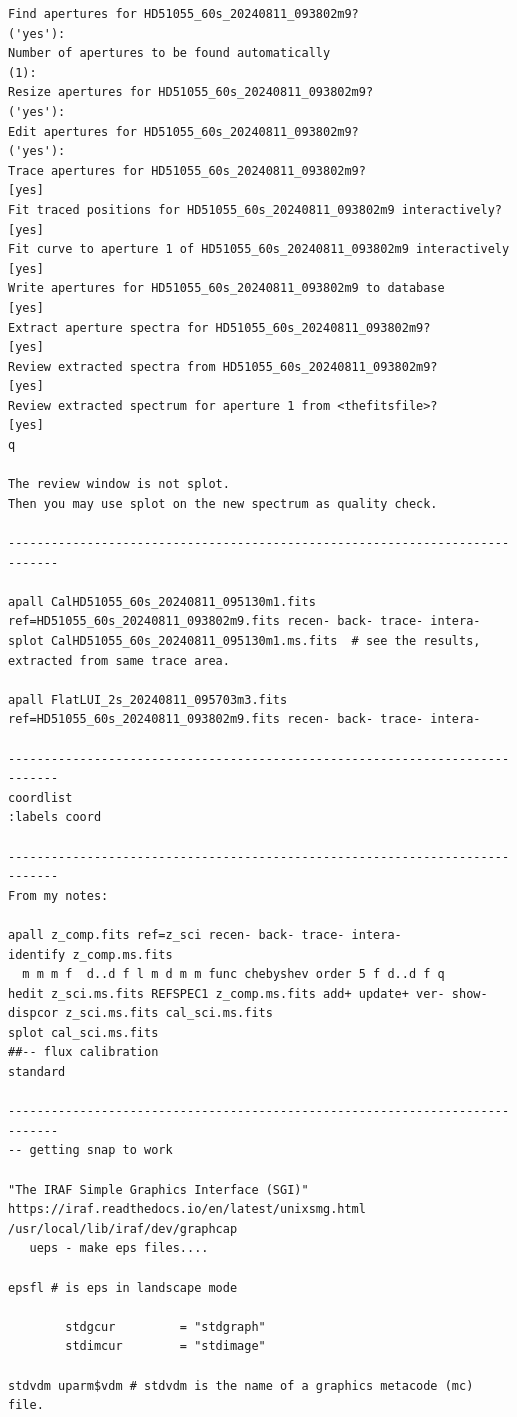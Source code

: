 \begin{verbatim}
Find apertures for HD51055_60s_20240811_093802m9?                       ('yes'): 
Number of apertures to be found automatically                           (1): 
Resize apertures for HD51055_60s_20240811_093802m9?                     ('yes'): 
Edit apertures for HD51055_60s_20240811_093802m9?                       ('yes'):    
Trace apertures for HD51055_60s_20240811_093802m9?                      [yes]
Fit traced positions for HD51055_60s_20240811_093802m9 interactively?   [yes]
Fit curve to aperture 1 of HD51055_60s_20240811_093802m9 interactively  [yes]
Write apertures for HD51055_60s_20240811_093802m9 to database           [yes]
Extract aperture spectra for HD51055_60s_20240811_093802m9?             [yes]
Review extracted spectra from HD51055_60s_20240811_093802m9?            [yes]
Review extracted spectrum for aperture 1 from <thefitsfile>?            [yes]
q

The review window is not splot.
Then you may use splot on the new spectrum as quality check.

-----------------------------------------------------------------------------

apall CalHD51055_60s_20240811_095130m1.fits ref=HD51055_60s_20240811_093802m9.fits recen- back- trace- intera-
splot CalHD51055_60s_20240811_095130m1.ms.fits  # see the results, extracted from same trace area.
 
apall FlatLUI_2s_20240811_095703m3.fits ref=HD51055_60s_20240811_093802m9.fits recen- back- trace- intera-

-----------------------------------------------------------------------------
coordlist
:labels coord

-----------------------------------------------------------------------------
From my notes:

apall z_comp.fits ref=z_sci recen- back- trace- intera-
identify z_comp.ms.fits
  m m m f  d..d f l m d m m func chebyshev order 5 f d..d f q
hedit z_sci.ms.fits REFSPEC1 z_comp.ms.fits add+ update+ ver- show-
dispcor z_sci.ms.fits cal_sci.ms.fits
splot cal_sci.ms.fits
##-- flux calibration
standard

-----------------------------------------------------------------------------
-- getting snap to work

"The IRAF Simple Graphics Interface (SGI)"
https://iraf.readthedocs.io/en/latest/unixsmg.html
/usr/local/lib/iraf/dev/graphcap
   ueps - make eps files....

epsfl # is eps in landscape mode

        stdgcur         = "stdgraph"
        stdimcur        = "stdimage"

stdvdm uparm$vdm # stdvdm is the name of a graphics metacode (mc) file.



\end{verbatim}
\endgroup

